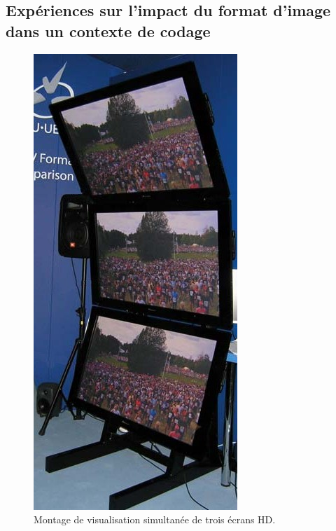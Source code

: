 \subsection{Expériences sur l'impact du format d'image dans un contexte de codage \avc} \label{ssec:ebu}
\begin{figure}
\includegraphics[width=1\linewidth]{img/chap1/ebu}
\caption{Montage de visualisation simultanée de trois écrans HD.} %
\label{fig:TroisEcransEBU}
\end{figure}
